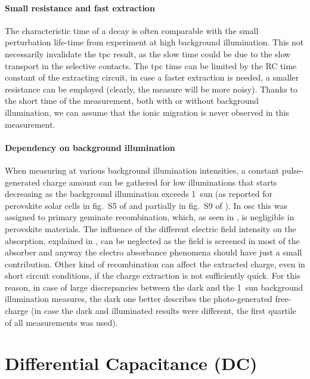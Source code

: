 	\paragraph{Small resistance and fast extraction}
	The characteristic time of a  decay is often comparable with the small perturbation life\hyp{}time from  experiment at high background illumination.
	This not necessarily invalidate the \gls{tpc} result, as the slow time could be due to the slow transport in the selective contacts.
	The \gls{tpc} time can be limited by the RC time constant of the extracting circuit, in case a faster extraction is needed, a smaller resistance can be employed (clearly, the measure will be more noisy).
	Thanks to the short time of the measurement, both with or without background illumination, we can assume that the ionic migration is never observed in this measurement.

	\paragraph{Dependency on background illumination}\label{tpc_intensity}
	When measuring  at various background illumination intensities, a constant pulse\hyp{}generated charge amount can be gathered for low illuminations that starts decreasing as the background illumination exceeds \SI{1}{sun} (as reported for perovskite solar cells in fig.~S5 of \cite{Du2018} and partially in fig.~S9 of \cite{Wheeler2017}).
	In \gls{osc} this was assigned to primary geminate recombination, which, as seen in , is negligible in perovskite materials.
	The influence of the different electric field intensity on the absorption, explained in , can be neglected as the field is screened in most of the absorber and anyway the electro absorbance phenomena should have just a small contribution.
	Other kind of recombination can affect the extracted charge, even in short circuit conditions, if the charge extraction is not sufficiently quick.
	For this reason, in case of large discrepancies between the dark and the \SI{1}{sun} background illumination measures, the dark one better describes the photo\hyp{}generated free\hyp{}charge (in case the dark and illuminated results were different, the first quartile of all  measurements was used).

	\FloatBarrier
	\newpage
\section{Differential Capacitance (DC)}

